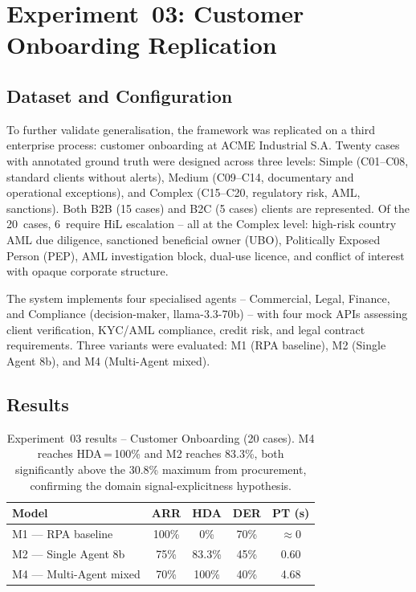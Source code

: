 \documentclass[preprint,12pt,authoryear]{elsarticle}
\begin{document}
\section{Experiment~03: Customer Onboarding Replication}
\label{sec:onboarding}

\subsection{Dataset and Configuration}

To further validate generalisation, the framework was replicated on a third
enterprise process: customer onboarding at ACME Industrial S.A.
Twenty cases with annotated ground truth were designed across three levels:
Simple (C01--C08, standard clients without alerts), Medium (C09--C14,
documentary and operational exceptions), and Complex (C15--C20, regulatory
risk, AML, sanctions).
Both B2B (15 cases) and B2C (5 cases) clients are represented.
Of the 20~cases, 6~require HiL escalation -- all at the Complex level:
high-risk country AML due diligence, sanctioned beneficial owner (UBO),
Politically Exposed Person (PEP), AML investigation block, dual-use licence,
and conflict of interest with opaque corporate structure.

The system implements four specialised agents -- Commercial, Legal, Finance,
and Compliance (decision-maker, llama-3.3-70b) -- with four mock APIs
assessing client verification, KYC/AML compliance, credit risk, and legal
contract requirements.
Three variants were evaluated: M1 (RPA baseline), M2 (Single Agent 8b),
and M4 (Multi-Agent mixed).

\subsection{Results}

\begin{table}[htbp]
\centering
\caption{Experiment~03 results -- Customer Onboarding (20 cases).
         M4 reaches HDA\,=\,100\% and M2 reaches 83.3\%, both significantly
         above the 30.8\% maximum from procurement, confirming the
         domain signal-explicitness hypothesis.}
\label{tab:onboarding}
\begin{tabular}{lcccc}
\toprule
\textbf{Model} & \textbf{ARR} & \textbf{HDA} & \textbf{DER} & \textbf{PT (s)} \\
\midrule
M1 --- RPA baseline      & 100\% & 0\%    & 70\% & $\approx$0 \\
M2 --- Single Agent 8b   &  75\% & 83.3\% & 45\% & 0.60 \\
M4 --- Multi-Agent mixed &  70\% & 100\%  & 40\% & 4.68 \\
\bottomrule
\end{tabular}
\end{table}
\end{document}
